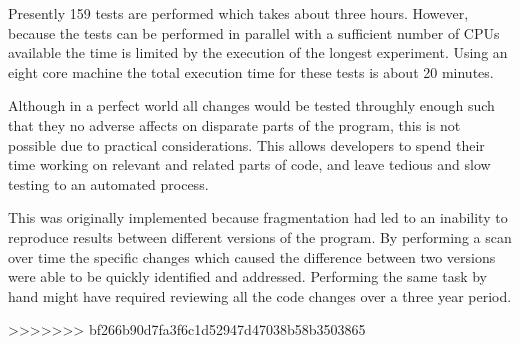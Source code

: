 Presently 159 tests are performed which takes about three hours.
However, because the tests can be performed in parallel with a sufficient number of CPUs available the time is limited by the execution of the longest experiment.
Using an eight core machine the total execution time for these tests is about 20 minutes.

Although in a perfect world all changes would be tested throughly enough such that they no adverse affects on disparate parts of the program, this is not possible due to practical considerations.
This allows developers to spend their time working on relevant and related parts of code, and leave tedious and slow testing to an automated process.

This was originally implemented because fragmentation had led to an inability to reproduce results between different versions of the program.
By performing a scan over time the specific changes which caused the difference between two versions were able to be quickly identified and addressed.
Performing the same task by hand might have required reviewing all the code changes over a three year period.




>>>>>>> bf266b90d7fa3f6c1d52947d47038b58b3503865
